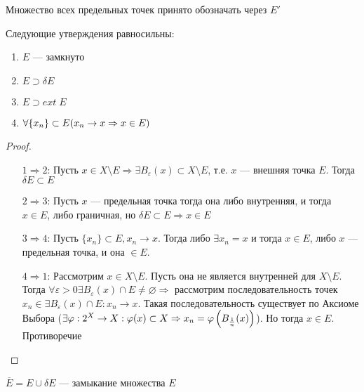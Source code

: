 Множество всех предельных точек принято обозначать через \(E'\)

\begin{theorem}
    Следующие утверждения равносильны:
    \begin{enumerate}
        \item \(E\) --- замкнуто
        \item \(E \supset \delta E\)
        \item \(E \supset ext\;E\)
        \item \(\forall \{x_n\} \subset E (x_n \rightarrow x \Rightarrow x \in E)\)
    \end{enumerate}
\end{theorem}
\begin{proof}\indent
    \begin{enumerate}
        \item[\(1 \Rightarrow 2\):] Пусть \(x \in X\setminus E \Rightarrow \exists B_\varepsilon(x) \subset X\setminus E\), т.е. \(x\) --- внешняя точка \(E\). Тогда \(\delta E \subset E\)
        \item[\(2 \Rightarrow 3\):] Пусть \(x\) --- предельная точка тогда она либо внутренняя, и тогда \(x \in E\), либо граничная, но \(\delta E \subset E \Rightarrow x \in E\)
        \item[\(3 \Rightarrow 4\):] Пусть \(\{x_n\} \subset E, x_n \rightarrow x\). Тогда либо \(\exists x_n = x\) и тогда \(x \in E\), либо \(x\) --- предельная точка, и она \(\in E\).
        \item[\(4 \Rightarrow 1\):] Рассмотрим \(x \in X\setminus E\). Пусть она не является внутренней для \(X\setminus E\). Тогда \(\forall \varepsilon > 0 \exists B_{\varepsilon}(x) \cap E \ne \varnothing \Rightarrow\) рассмотрим последовательность точек \(x_n\in \exists B_{\varepsilon}(x) \cap E: x_n \rightarrow x\). Такая последовательность существует по Аксиоме Выбора (\(\exists \varphi: 2^X \rightarrow X: \varphi(x) \subset X \Rightarrow x_n = \varphi\left(B_\frac{1}{n}(x)\right)\)). Но тогда \(x \in E\). Противоречие 
    \end{enumerate}    
\end{proof}

\begin{definition}
    \(\overline{E} = E \cup \delta E\) ---  замыкание множества \(E\)
\end{definition}


